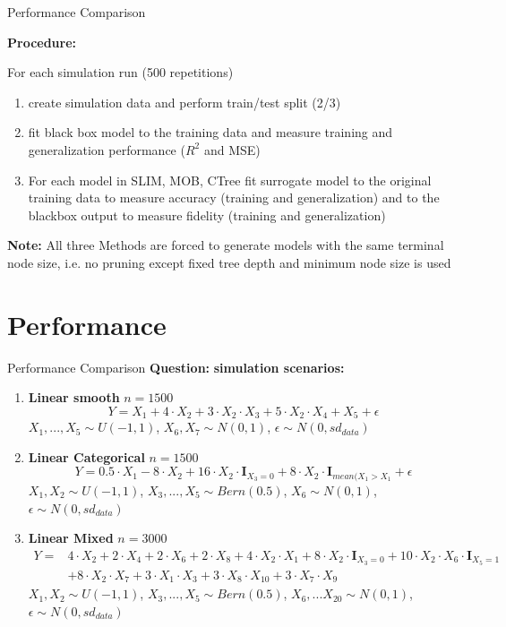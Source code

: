 \documentclass[9pt, xcolor=table]{beamer}
\begin{document}
\begin{frame}{Performance Comparison}


\textbf{Procedure:} 

For each simulation run (500 repetitions)
\begin{enumerate}
    \item create simulation data and perform train/test split (2/3)
    \item fit black box model to the training data and measure training and generalization performance ($R^2$ and MSE)
    \item For each model in SLIM, MOB, CTree fit surrogate model to the original training data to measure accuracy (training and generalization) and to the blackbox output to measure fidelity (training and generalization)
\end{enumerate}

\textbf{Note:} All three Methods are forced to generate models with the same terminal node size, i.e. no pruning except fixed tree depth and minimum node size is used

\end{frame}

\section{Performance}
\begin{frame}{Performance Comparison}
\textbf{Question:} 
\textbf{simulation scenarios:}
\begin{enumerate}
    \item \textbf{Linear smooth} $n= 1500$ $$ Y = X_1 + 4 \cdot X_2 + 3 \cdot X_2 \cdot X_3 + 5\cdot X_2\cdot X_4 + X_5 + \epsilon $$
    $X_1,..., X_5 \sim U(-1,1)$, $X_6, X_7 \sim N(0,1)$, $\epsilon \sim N(0, sd_{data})$
    
    \item \textbf{Linear Categorical} $n= 1500$ $$ Y =  0.5\cdot X_{1} - 8\cdot X_2 + 16\cdot X_2\cdot \mathbf{I}_{X_3 = 0} + 8\cdot X_2\cdot \mathbf{I}_{mean(X_1 > X_1} + \epsilon $$
    $X_1, X_2 \sim U(-1,1)$, $X_3, ..., X_5 \sim Bern(0.5)$, $X_6 \sim N(0,1)$,  $\epsilon \sim N(0, sd_{data})$
    
    \item \textbf{Linear Mixed}  $n= 3000$
    \begin{align*}
    Y = & 4 \cdot X_2 + 2 \cdot X_4 + 2 \cdot X_6 + 2 \cdot X_8 + 4 \cdot X_2 \cdot X_1 + 8 \cdot X_2 \cdot \mathbf{I}_{X_3 = 0} + 10 \cdot X_2 \cdot X_6  \cdot \mathbf{I}_{X_5 = 1} \\
    & + 8 \cdot X_2 \cdot X_7 + 3 \cdot X_1 \cdot X_3 + 3 \cdot X_8 \cdot X_10 + 3 \cdot X_7 \cdot X_9     
    \end{align*}
    $X_1, X_2 \sim U(-1,1)$, $X_3, ..., X_5 \sim Bern(0.5)$, $X_6, ... X_20 \sim N(0,1)$,  $\epsilon \sim N(0, sd_{data})$
\end{enumerate}
    
\end{frame}
\end{document}
